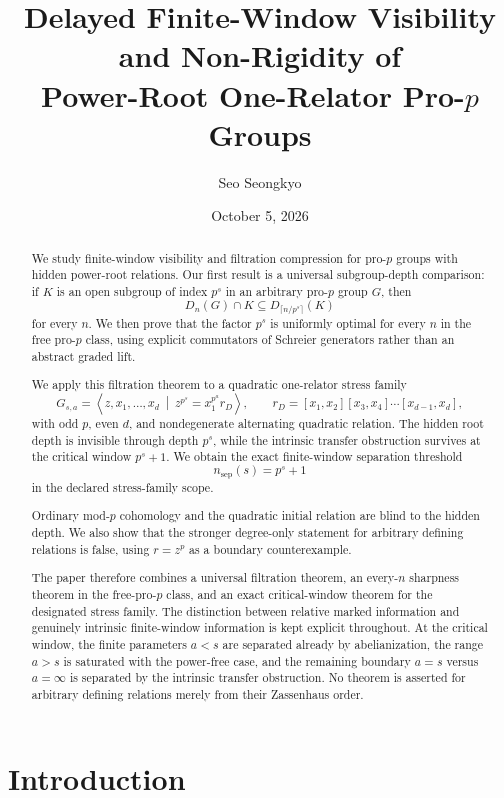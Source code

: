 \documentclass[11pt]{article}
\title{Delayed Finite-Window Visibility and Non-Rigidity of\\
Power-Root One-Relator Pro-\texorpdfstring{$p$}{p} Groups}
\author{Seo Seongkyo}
\date{October 5, 2026}
\begin{document}
\maketitle

\begin{abstract}
We study finite-window visibility and filtration compression for pro-$p$ groups with hidden power-root relations.  Our first result is a universal subgroup-depth comparison: if $K$ is an open subgroup of index $p^s$ in an arbitrary pro-$p$ group $G$, then
\[
D_n(G)\cap K\subseteq D_{\lceil n/p^s\rceil}(K)
\]
for every $n$.  We then prove that the factor $p^s$ is uniformly optimal for every $n$ in the free pro-$p$ class, using explicit commutators of Schreier generators rather than an abstract graded lift.

We apply this filtration theorem to a quadratic one-relator stress family
\[
G_{s,a}=\left\langle z,x_1,\ldots,x_d\ \middle|\
z^{p^s}=x_1^{p^a}r_D\right\rangle,
\qquad
r_D=[x_1,x_2][x_3,x_4]\cdots[x_{d-1},x_d],
\]
with odd $p$, even $d$, and nondegenerate alternating quadratic relation.  The hidden root depth is invisible through depth $p^s$, while the intrinsic transfer obstruction survives at the critical window $p^s+1$.  We obtain the exact finite-window separation threshold
\[
n_{\mathrm{sep}}(s)=p^s+1
\]
in the declared stress-family scope.

Ordinary mod-$p$ cohomology and the quadratic initial relation are blind to the hidden depth.  We also show that the stronger degree-only statement for arbitrary defining relations is false, using $r=z^p$ as a boundary counterexample.

The paper therefore combines a universal filtration theorem, an every-$n$ sharpness theorem in the free-pro-$p$ class, and an exact critical-window theorem for the designated stress family.  The distinction between relative marked information and genuinely intrinsic finite-window information is kept explicit throughout.  At the critical window, the finite parameters $a<s$ are separated already by abelianization, the range $a>s$ is saturated with the power-free case, and the remaining boundary $a=s$ versus $a=\infty$ is separated by the intrinsic transfer obstruction.  No theorem is asserted for arbitrary
defining relations merely from their Zassenhaus order.
\end{abstract}

\section{Introduction}
\end{document}
